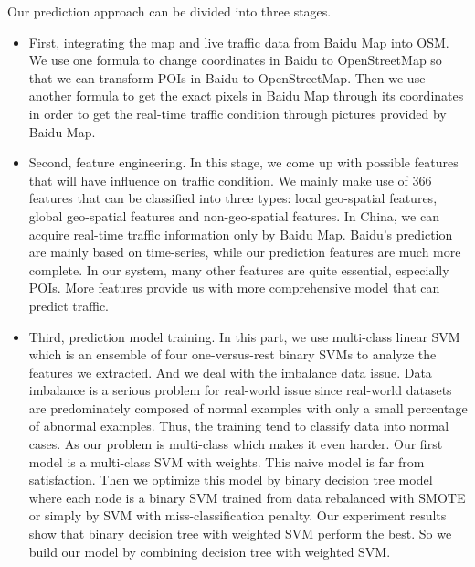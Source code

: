 Our prediction approach can be divided into three stages.
\begin{itemize}
\item First, integrating
the map and live traffic data from Baidu Map into OSM. We use one formula to
change coordinates in Baidu to OpenStreetMap so that we can 
transform POIs in Baidu to OpenStreetMap. Then we use another
formula to get the exact pixels in Baidu Map through its coordinates in order to 
get the real-time traffic condition through pictures provided by Baidu Map.

\item Second, feature engineering. In this stage, we come up with possible features that will have influence on traffic condition.
We mainly make use of 366 features that can be classified into three types: local geo-spatial
features, global geo-spatial features and non-geo-spatial features. 
In China, we can acquire real-time traffic information only by Baidu Map.
Baidu's prediction are mainly based on time-series, while our prediction features are much more complete.
In our system, many other features are quite essential, especially POIs. More features provide us with more comprehensive model that can predict traffic.

\item Third, prediction model training.
In this part, we use multi-class linear SVM \cite{multisvm}
which is an ensemble of four one-versus-rest binary SVMs to 
analyze the features we extracted.
And we deal with the imbalance data issue.
Data imbalance is a serious problem for real-world issue since 
real-world datasets are predominately composed of normal examples with only a small percentage of abnormal examples.
Thus, the training tend to classify data into normal cases. As our
problem is multi-class which makes it even harder.
Our first model is a multi-class SVM with weights. This naive model is far from satisfaction.
Then we optimize this model by binary decision tree model where each node is a binary
SVM trained from data rebalanced with SMOTE \cite{chawla2002smote} or simply by SVM with miss-classification penalty.
Our experiment results show that binary decision tree with weighted SVM perform the best.
So we build our model by combining decision tree with weighted SVM.
\end{itemize}

